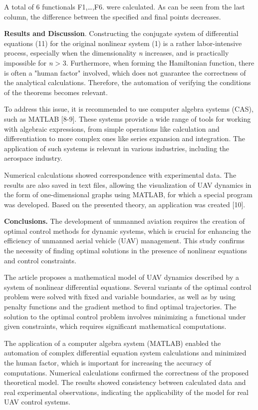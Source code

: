 A total of 6 functionals F1,\ldots,F6. were calculated. As can be seen
from the last column, the difference between the specified and final
points decreases.
\begin{multicols}{2}

{\bfseries Results and Discussion}. Constructing the conjugate system of
differential equations (11) for the original nonlinear system (1) is a
rather labor-intensive process, especially when the dimensionality
\emph{n} increases, and is practically impossible for \emph{n}
\textgreater{} 3. Furthermore, when forming the Hamiltonian function,
there is often a "human factor" involved, which does not guarantee the
correctness of the analytical calculations. Therefore, the automation of
verifying the conditions of the theorems becomes relevant.

To address this issue, it is recommended to use computer algebra systems
(CAS), such as MATLAB {[}8-9{]}. These systems provide a wide range of
tools for working with algebraic expressions, from simple operations
like calculation and differentiation to more complex ones like series
expansion and integration. The application of such systems is relevant
in various industries, including the aerospace industry.

Numerical calculations showed correspondence with experimental data. The
results are also saved in text files, allowing the visualization of UAV
dynamics in the form of one-dimensional graphs using MATLAB, for which a
special program was developed. Based on the presented theory, an
application was created {[}10{]}.

{\bfseries Conclusions.} The development of unmanned aviation requires the
creation of optimal control methods for dynamic systems, which is
crucial for enhancing the efficiency of unmanned aerial vehicle (UAV)
management. This study confirms the necessity of finding optimal
solutions in the presence of nonlinear equations and control
constraints.

The article proposes a mathematical model of UAV dynamics described by a
system of nonlinear differential equations. Several variants of the
optimal control problem were solved with fixed and variable boundaries,
as well as by using penalty functions and the gradient method to find
optimal trajectories. The solution to the optimal control problem
involves minimizing a functional under given constraints, which requires
significant mathematical computations.

The application of a computer algebra system (MATLAB) enabled the
automation of complex differential equation system calculations and
minimized the human factor, which is important for increasing the
accuracy of computations. Numerical calculations confirmed the
correctness of the proposed theoretical model. The results showed
consistency between calculated data and real experimental observations,
indicating the applicability of the model for real UAV control systems.


\end{multicols}
